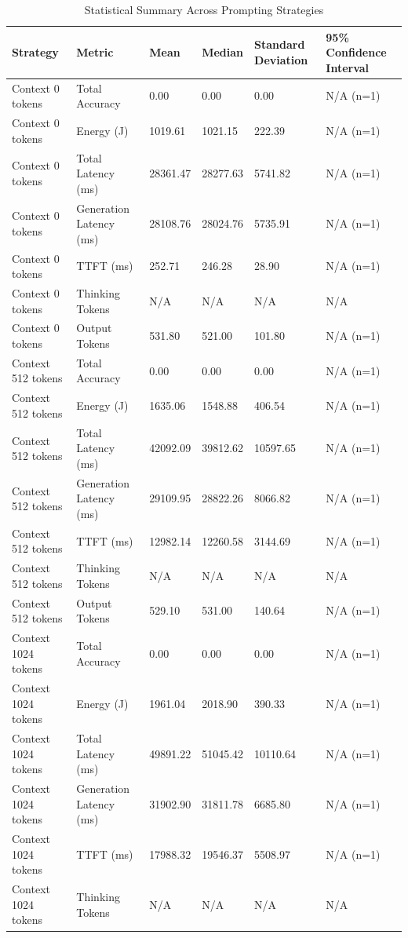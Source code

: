 \begin{table}
\caption{Statistical Summary Across Prompting Strategies}
\label{tab:statistical_summary}
\begin{tabular}{llllll}
\toprule
Strategy & Metric & Mean & Median & Standard Deviation & 95\% Confidence Interval \\
\midrule
Context 0 tokens & Total Accuracy & 0.00 & 0.00 & 0.00 & N/A (n=1) \\
Context 0 tokens & Energy (J) & 1019.61 & 1021.15 & 222.39 & N/A (n=1) \\
Context 0 tokens & Total Latency (ms) & 28361.47 & 28277.63 & 5741.82 & N/A (n=1) \\
Context 0 tokens & Generation Latency (ms) & 28108.76 & 28024.76 & 5735.91 & N/A (n=1) \\
Context 0 tokens & TTFT (ms) & 252.71 & 246.28 & 28.90 & N/A (n=1) \\
Context 0 tokens & Thinking Tokens & N/A & N/A & N/A & N/A \\
Context 0 tokens & Output Tokens & 531.80 & 521.00 & 101.80 & N/A (n=1) \\
Context 512 tokens & Total Accuracy & 0.00 & 0.00 & 0.00 & N/A (n=1) \\
Context 512 tokens & Energy (J) & 1635.06 & 1548.88 & 406.54 & N/A (n=1) \\
Context 512 tokens & Total Latency (ms) & 42092.09 & 39812.62 & 10597.65 & N/A (n=1) \\
Context 512 tokens & Generation Latency (ms) & 29109.95 & 28822.26 & 8066.82 & N/A (n=1) \\
Context 512 tokens & TTFT (ms) & 12982.14 & 12260.58 & 3144.69 & N/A (n=1) \\
Context 512 tokens & Thinking Tokens & N/A & N/A & N/A & N/A \\
Context 512 tokens & Output Tokens & 529.10 & 531.00 & 140.64 & N/A (n=1) \\
Context 1024 tokens & Total Accuracy & 0.00 & 0.00 & 0.00 & N/A (n=1) \\
Context 1024 tokens & Energy (J) & 1961.04 & 2018.90 & 390.33 & N/A (n=1) \\
Context 1024 tokens & Total Latency (ms) & 49891.22 & 51045.42 & 10110.64 & N/A (n=1) \\
Context 1024 tokens & Generation Latency (ms) & 31902.90 & 31811.78 & 6685.80 & N/A (n=1) \\
Context 1024 tokens & TTFT (ms) & 17988.32 & 19546.37 & 5508.97 & N/A (n=1) \\
Context 1024 tokens & Thinking Tokens & N/A & N/A & N/A & N/A \\

\end{tabular}
\end{table}
